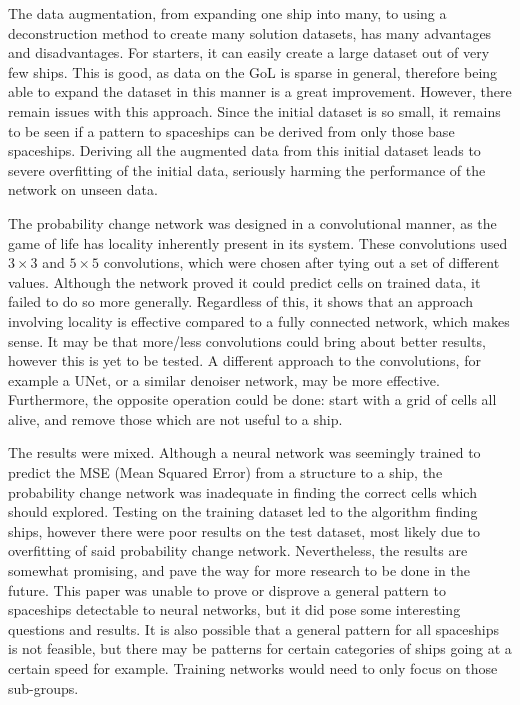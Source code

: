 \documentclass{l4proj}
\begin{document}
The data augmentation, from expanding one ship into many, to using a deconstruction method to create many solution datasets, has many advantages and disadvantages. For starters, it can easily create a large dataset out of very few ships. This is good, as data on the GoL is sparse in general, therefore being able to expand the dataset in this manner is a great improvement. However, there remain issues with this approach. Since the initial dataset is so small, it remains to be seen if a pattern to spaceships can be derived from only those base spaceships. Deriving all the augmented data from this initial dataset leads to severe overfitting of the initial data, seriously harming the performance of the network on unseen data.

The probability change network was designed in a convolutional manner, as the game of life has locality inherently present in its system. These convolutions used $3 \times 3$ and $5 \times 5$ convolutions, which were chosen after tying out a set of different values. Although the network proved it could predict cells on trained data, it failed to do so more generally. Regardless of this, it shows that an approach involving locality is effective compared to a fully connected network, which makes sense. It may be that more/less convolutions could bring about better results, however this is yet to be tested. A different approach to the convolutions, for example a UNet, or a similar denoiser network, may be more effective. Furthermore, the opposite operation could be done: start with a grid of cells all alive, and remove those which are not useful to a ship.

The results were mixed. Although a neural network was seemingly trained to predict the MSE (Mean Squared Error) from a structure to a ship, the probability change network was inadequate in finding the correct cells which should explored. Testing on the training dataset led to the algorithm finding ships, however there were poor results on the test dataset, most likely due to overfitting of said probability change network. Nevertheless, the results are somewhat promising, and pave the way for more research to be done in the future. This paper was unable to prove or disprove a general pattern to spaceships detectable to neural networks, but it did pose some interesting questions and results. It is also possible that a general pattern for all spaceships is not feasible, but there may be patterns for certain categories of ships going at a certain speed for example. Training networks would need to only focus on those sub-groups.
\end{document}
